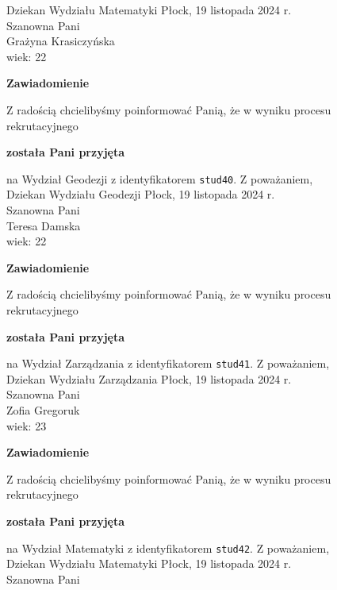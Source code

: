 \documentclass[12pt,a4paper]{article}
\begin{document}
Dziekan
Wydziału Matematyki
\newpage
\hfill Płock, 19 listopada 2024 r. \\
\noindent
Szanowna Pani \\
Grażyna Krasiczyńska \\
wiek: 22
\bigskip
\begin{center}
    {\Large\textbf{Zawiadomienie}}
\end{center}
\bigskip 
Z radością chcielibyśmy poinformować Panią, że w wyniku procesu rekrutacyjnego
\begin{center}
\textsf{\textbf{została Pani przyjęta}}
\end{center}
na Wydział Geodezji z identyfikatorem \verb|stud40|. 
\vspace{2cm}
\noindent
Z poważaniem, \\
Dziekan
Wydziału Geodezji
\newpage
\hfill Płock, 19 listopada 2024 r. \\
\noindent
Szanowna Pani \\
Teresa Damska \\
wiek: 22
\bigskip
\begin{center}
    {\Large\textbf{Zawiadomienie}}
\end{center}
\bigskip 
Z radością chcielibyśmy poinformować Panią, że w wyniku procesu rekrutacyjnego
\begin{center}
\textsf{\textbf{została Pani przyjęta}}
\end{center}
na Wydział Zarządzania z identyfikatorem \verb|stud41|. 
\vspace{2cm}
\noindent
Z poważaniem, \\
Dziekan
Wydziału Zarządzania
\newpage
\hfill Płock, 19 listopada 2024 r. \\
\noindent
Szanowna Pani \\
Zofia Gregoruk \\
wiek: 23
\bigskip
\begin{center}
    {\Large\textbf{Zawiadomienie}}
\end{center}
\bigskip 
Z radością chcielibyśmy poinformować Panią, że w wyniku procesu rekrutacyjnego
\begin{center}
\textsf{\textbf{została Pani przyjęta}}
\end{center}
na Wydział Matematyki z identyfikatorem \verb|stud42|. 
\vspace{2cm}
\noindent
Z poważaniem, \\
Dziekan
Wydziału Matematyki
\newpage
\hfill Płock, 19 listopada 2024 r. \\
\noindent
Szanowna Pani \\
\end{document}
